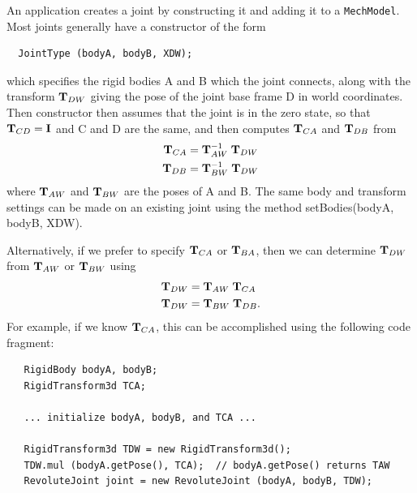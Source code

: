 An application creates a joint by constructing it and adding it to a
{\tt MechModel}. Most joints generally have a constructor of the form
%
\begin{lstlisting}
  JointType (bodyA, bodyB, XDW);
\end{lstlisting}
%
which specifies the rigid bodies A and B which the joint connects,
along with the transform ${\bf T}_{DW}$ giving the pose of the joint base
frame D in world coordinates. Then constructor then assumes that the
joint is in the zero state, so that ${\bf T}_{CD} = {\bf I}$ and C and D are
the same, and then computes
${\bf T}_{CA}$ and ${\bf T}_{DB}$ from
%
\begin{align}
{\bf T}_{CA} & = {\bf T}_{AW}^{-1} \; {\bf T}_{DW} \\
{\bf T}_{DB} & = {\bf T}_{BW}^{-1} \; {\bf T}_{DW}
\end{align}
%
where ${\bf T}_{AW}$ and ${\bf T}_{BW}$ are the poses of A and B.
The same body and transform settings can be made on an existing
joint using the method
{setBodies(bodyA, bodyB, XDW)}.

Alternatively, if we prefer to specify ${\bf T}_{CA}$ or ${\bf T}_{BA}$, then we
can determine ${\bf T}_{DW}$ from ${\bf T}_{AW}$ or ${\bf T}_{BW}$ using
%
\begin{align}
{\bf T}_{DW} & = {\bf T}_{AW} \; {\bf T}_{CA} \\
{\bf T}_{DW} & = {\bf T}_{BW} \; {\bf T}_{DB}.
\end{align}
%
For example, if we know ${\bf T}_{CA}$, this can be accomplished using
the following code fragment:
%
\begin{lstlisting}
   RigidBody bodyA, bodyB;
   RigidTransform3d TCA;

   ... initialize bodyA, bodyB, and TCA ...
   
   RigidTransform3d TDW = new RigidTransform3d();
   TDW.mul (bodyA.getPose(), TCA);  // bodyA.getPose() returns TAW
   RevoluteJoint joint = new RevoluteJoint (bodyA, bodyB, TDW);
\end{lstlisting}
%


